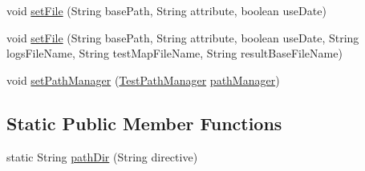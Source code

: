 \begin{DoxyCompactItemize}
\item 
void \hyperlink{classit_1_1emarolab_1_1cagg_1_1interfaces_1_1CaggGrammarTesterOnFile_a0fbb51cc4b6ffab181e8d7a6260c077f}{set\-File} (String base\-Path, String attribute, boolean use\-Date)
\item 
void \hyperlink{classit_1_1emarolab_1_1cagg_1_1interfaces_1_1CaggGrammarTesterOnFile_ac100a7be65eb1422b187167cc8b97607}{set\-File} (String base\-Path, String attribute, boolean use\-Date, String logs\-File\-Name, String test\-Map\-File\-Name, String result\-Base\-File\-Name)
\item 
void \hyperlink{classit_1_1emarolab_1_1cagg_1_1interfaces_1_1CaggGrammarTesterOnFile_a35ac3243a70469cf14998d4c8e763fa8}{set\-Path\-Manager} (\hyperlink{classit_1_1emarolab_1_1cagg_1_1interfaces_1_1CaggGrammarTesterOnFile_1_1TestPathManager}{Test\-Path\-Manager} \hyperlink{classit_1_1emarolab_1_1cagg_1_1interfaces_1_1CaggGrammarTesterOnFile_a9ec5e0710fd9124f63294f5596d38a3e}{path\-Manager})
\end{DoxyCompactItemize}
\subsection*{Static Public Member Functions}
\begin{DoxyCompactItemize}
\item 
static String \hyperlink{classit_1_1emarolab_1_1cagg_1_1interfaces_1_1CaggGrammarTesterOnFile_aa398e2cc3a5a0d558b20109c022fc037}{path\-Dir} (String directive)
\end{DoxyCompactItemize}
